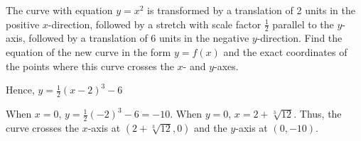 \clearpage
\begin{problem}
    The curve with equation $y=x^2$ is transformed by a translation of 2 units in the positive $x$-direction, followed by a stretch with scale factor $\frac12$ parallel to the $y$-axis, followed by a translation of 6 units in the negative $y$-direction. Find the equation of the new curve in the form $y = f(x)$ and the exact coordinates of the points where this curve crosses the $x$- and $y$-axes.
\end{problem}
\begin{solution}
    \begin{center}
    \end{center}

    Hence, $y = \frac12 (x-2)^3 - 6$

    When $x=0$, $y = \frac12 (-2)^3 - 6 = -10$. When $y = 0$, $x = 2 + \sqrt[3]{12}$. Thus, the curve crosses the $x$-axis at $(2 + \sqrt[3]{12}, 0)$ and the $y$-axis at $(0, -10)$.
\end{solution}

